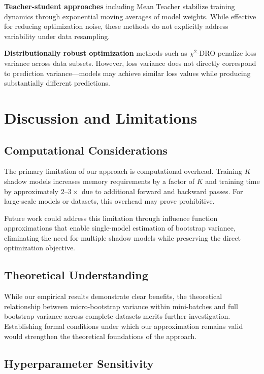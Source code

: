 \documentclass[12pt, letterpaper]{article}
\begin{document}
\textbf{Teacher-student approaches} including Mean Teacher \cite{tarvainen2017mean} stabilize training dynamics through exponential moving averages of model weights. While effective for reducing optimization noise, these methods do not explicitly address variability under data resampling.

\textbf{Distributionally robust optimization} methods such as $\chi^2$-DRO \cite{duchi2021learning} penalize loss variance across data subsets. However, loss variance does not directly correspond to prediction variance---models may achieve similar loss values while producing substantially different predictions.

\section{Discussion and Limitations}

\subsection{Computational Considerations}

The primary limitation of our approach is computational overhead. Training $K$ shadow models increases memory requirements by a factor of $K$ and training time by approximately $2$--$3\times$ due to additional forward and backward passes. For large-scale models or datasets, this overhead may prove prohibitive.

Future work could address this limitation through influence function approximations that enable single-model estimation of bootstrap variance, eliminating the need for multiple shadow models while preserving the direct optimization objective.

\subsection{Theoretical Understanding}

While our empirical results demonstrate clear benefits, the theoretical relationship between micro-bootstrap variance within mini-batches and full bootstrap variance across complete datasets merits further investigation. Establishing formal conditions under which our approximation remains valid would strengthen the theoretical foundations of the approach.

\subsection{Hyperparameter Sensitivity}
\end{document}
